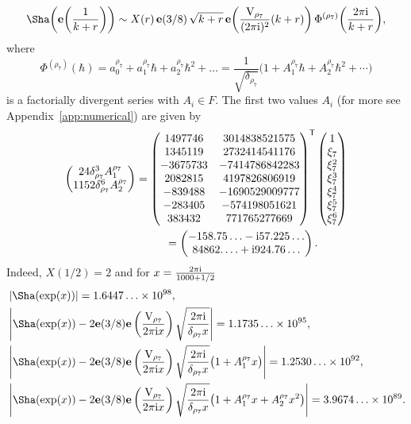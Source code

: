 \documentclass[pdftex]{sigma}
\numberwithin{equation}{section}
\def\be{\begin{equation}}
\def\ee{\end{equation}}
\def\e{\mathbf e}
\def\VC{\mathrm{VC}}
\def\WRT{\Sha}
\def\be{\begin{equation}}
\def\ee{\end{equation}}
\def\VC{\mathrm{V}}
\begin{document}
\be\label{qmodnum}
 \WRT\biggl(\e\biggl(\frac{1}{k+r}\biggr)\biggr)
 \sim
 X(r)\,\e(3/8)\,\sqrt{k+r}\,\e\biggl(\frac{\VC_{\rho_7}}{(2\pi {\rm i})^2}(k+r)\biggr)\,\Phi^{(\rho_7)}\biggl(\frac{2\pi {\rm i}}{k+r}\biggr),
\ee
where
\[
 \Phi^{(\rho_7)}(\hbar)
  =
 a^{\rho_7}_0+a^{\rho_7}_1\hbar+a^{\rho_7}_2\hbar^2+\dots
  =
 \frac{1}{\sqrt{\delta_{\rho_7}}}\bigl(1+A^{\rho_7}_1\hbar+A^{\rho_7}_2\hbar^2+\cdots\bigr)
\]
is a factorially divergent series with $A_{i}\in F$. The first two values $A_i$ (for more see Appendix~\ref{app:numerical}) are given by
\begin{gather}
 \begin{pmatrix}
 24\delta_{\rho_7}^3A^{\rho_7}_1\\
 1152\delta_{\rho_7}^6A^{\rho_7}_2
 \end{pmatrix}
  =
 \begin{pmatrix}
 1497746 & 3014838521575\\
 1345119 & 2732414541176\\
 -3675733 & -7414786842283\\
 2082815 & 4197826806919\\
 -839488 & -1690529009777\\
 -283405 & -574198051621\\
 383432 & 771765277669
 \end{pmatrix}^{\mathsf{T}}
 \begin{pmatrix}
 1\\
 \xi_7\\
 \xi_7^2\\
 \xi_7^3\\
 \xi_7^4\\
 \xi_7^5\\
 \xi_7^6
 \end{pmatrix} \nonumber\\
 \hphantom{\begin{pmatrix}
 24\delta_{\rho_7}^3A^{\rho_7}_1\\
 1152\delta_{\rho_7}^6A^{\rho_7}_2
 \end{pmatrix}}{}
  =
 \begin{pmatrix}
 -158.75\ldots - {\rm i}57.225\dots\\
 84862.\ldots + {\rm i}924.76\dots
 \end{pmatrix}.\label{eq:first.two.coeffs}
\end{gather}
Indeed, $X(1/2)=2$ and for $x=\frac{2\pi {\rm i}}{1000+1/2}$
\begin{align*}
 &\left|\WRT(\exp(x))\right|
 =1.6447\ldots\times 10^{98} ,\\
 &\left|\WRT(\exp(x))-2\e(3/8)\e\left(\frac{\VC_{\rho_7}}{2\pi {\rm i}x}\right)\sqrt{\frac{2\pi {\rm i}}{\delta_{\rho_7}x}}\right|
 =1.1735\ldots\times10^{95} ,\\
 &\left|\WRT(\exp(x))-2\e(3/8)\e\left(\frac{\VC_{\rho_7}}{2\pi {\rm i}x}\right)\sqrt{\frac{2\pi {\rm i}}{\delta_{\rho_7}x}}\bigl(1+A^{\rho_7}_1x\bigr)\right|
 =1.2530\ldots\times10^{92} ,\\
 &\left|\WRT(\exp(x))-2 \e(3/8) \e\left(\frac{\VC_{\rho_7}}{2\pi {\rm i}x}\right)\sqrt{\frac{2\pi {\rm i}}{\delta_{\rho_7}x}}\bigl(1+A^{\rho_7}_1x+A^{\rho_7}_2x^2\bigr)\right|
 =3.9674\ldots\times10^{89} .
\end{align*}
\end{document}
